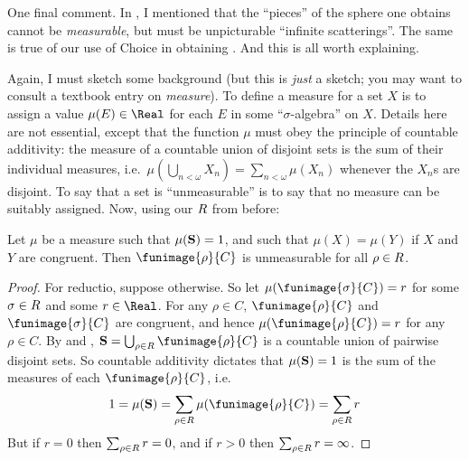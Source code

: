 \documentclass[../../../include/open-logic-section]{subfiles}
\begin{document}
One final comment. In , I mentioned that the ``pieces'' of the sphere one obtains cannot be \emph{measurable}, but must be unpicturable ``infinite scatterings''. The same is true of our use of Choice in obtaining . And this is all worth explaining.

Again, I must sketch some background (but this is \emph{just} a sketch; you may want to consult a textbook entry on \emph{measure}). To define a measure for a set $X$ is to assign a value $\mu(E) \in \Real$ for each $E$ in some ``$\sigma$-algebra'' on $X$. Details here are not essential, except that the function $\mu$ must obey the principle of countable additivity: the measure of a countable union of disjoint sets is the sum of their individual measures, i.e.\ $\mu(\bigcup_{n < \omega} X_n) = \sum_{n < \omega}\mu(X_n)$ whenever the $X_n$s are disjoint. To say that a set is ``unmeasurable'' is to say that no measure can be suitably assigned. Now, using our $R$ from before:
\begin{cor}[Vitali]Let $\mu$ be a measure such that $\mu(\mathbf{S}) = 1$, and such that $\mu(X) = \mu(Y)$ if $X$ and $Y$ are congruent. Then $\funimage{\rho}{C}$ is unmeasurable for all $\rho \in R$. 
\end{cor}
\begin{proof}
	For reductio, suppose otherwise. So let $\mu(\funimage{\sigma}{C}) = r$ for some $\sigma \in R$ and some $r \in \Real$. For any $\rho \in C$, $\funimage{\rho}{C}$ and $\funimage{\sigma}{C}$ are congruent, and hence  $\mu(\funimage{\rho}{C}) = r$ for any $\rho \in C$. By  and , $\onesphere = \bigcup_{\rho \in \rotationsgroup}\funimage{\rho}{C}$ is a countable union of pairwise disjoint sets. So countable additivity dictates that $\mu(\mathbf{S}) = 1$ is the sum of the measures of each $\funimage{\rho}{C}$, i.e.\ 
	$$1 = \mu(\onesphere) = \sum_{\rho \in \rotationsgroup}\mu(\funimage{\rho}{C}) = \sum_{\rho \in \rotationsgroup}r$$
	But if $r = 0$ then $\sum_{\rho \in R}r = 0$, and if $r > 0$ then $\sum_{\rho \in R}r = \infty$. 
\end{proof}
\end{document}

